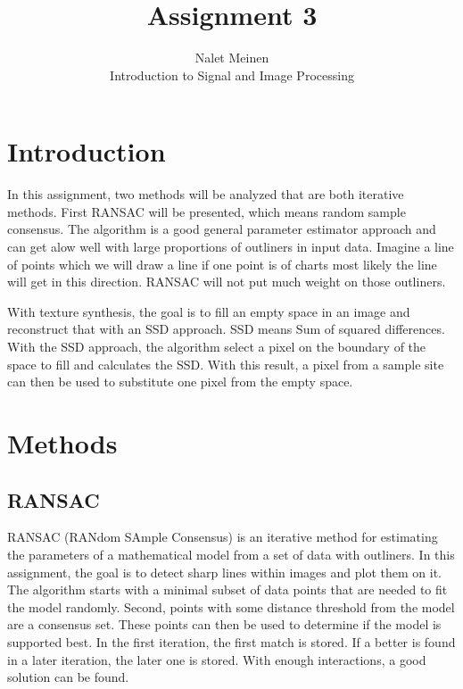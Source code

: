 \documentclass[12pt]{article}
\begin{document}


\title{Assignment 3}%
\author{Nalet Meinen\\ %
Introduction to Signal and Image Processing
}

\maketitle

\tableofcontents
\pagebreak
\section{Introduction}
In this assignment, two methods will be analyzed that are both iterative methods. First RANSAC will be presented, which means random sample consensus. The algorithm is a good general parameter estimator approach and can get alow well with large proportions of outliners in input data. Imagine a line of points which we will draw a line if one point is of charts most likely the line will get in this direction. RANSAC will not put much weight on those outliners.

With texture synthesis, the goal is to fill an empty space in an image and reconstruct that with an SSD approach. SSD means Sum of squared differences. With the SSD approach, the algorithm select a pixel on the boundary of the space to fill and calculates the SSD. With this result, a pixel from a sample site can then be used to substitute one pixel from the empty space.

\section{Methods}

\subsection{RANSAC}
RANSAC (RANdom SAmple Consensus) is an iterative method for estimating the parameters of a mathematical model from a set of data with outliners. In this assignment, the goal is to detect sharp lines within images and plot them on it. The algorithm starts with a minimal subset of data points that are needed to fit the model randomly. Second, points with some distance threshold from the model are a consensus set. These points can then be used to determine if the model is supported best. In the first iteration, the first match is stored. If a better is found in a later iteration, the later one is stored. With enough interactions, a good solution can be found.
\end{document}

